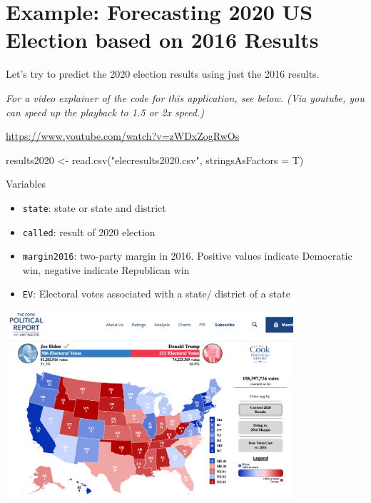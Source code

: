 \documentclass[
  letterpaper,
  DIV=11,
  numbers=noendperiod]{scrreprt}
\newenvironment{Shaded}{\begin{snugshade}}{\end{snugshade}}
\newcommand{\AttributeTok}[1]{\textcolor[rgb]{0.40,0.45,0.13}{#1}}
\newcommand{\FunctionTok}[1]{\textcolor[rgb]{0.28,0.35,0.67}{#1}}
\newcommand{\NormalTok}[1]{\textcolor[rgb]{0.00,0.23,0.31}{#1}}
\newcommand{\OtherTok}[1]{\textcolor[rgb]{0.00,0.23,0.31}{#1}}
\newcommand{\StringTok}[1]{\textcolor[rgb]{0.13,0.47,0.30}{#1}}
\providecommand{\tightlist}{%
  \setlength{\itemsep}{0pt}\setlength{\parskip}{0pt}}\usepackage{longtable,booktabs,array}
\begin{document}
\hypertarget{example-forecasting-2020-us-election-based-on-2016-results}{%
\section{Example: Forecasting 2020 US Election based on 2016
Results}\label{example-forecasting-2020-us-election-based-on-2016-results}}

Let's try to predict the 2020 election results using just the 2016
results.

\emph{For a video explainer of the code for this application, see below.
(Via youtube, you can speed up the playback to 1.5 or 2x speed.)}

\url{https://www.youtube.com/watch?v=zWDxZogRwOs}

\begin{Shaded}
\begin{Highlighting}[]
\NormalTok{results2020 }\OtherTok{\textless{}{-}} \FunctionTok{read.csv}\NormalTok{(}\StringTok{"elecresults2020.csv"}\NormalTok{, }\AttributeTok{stringsAsFactors =}\NormalTok{ T)}
\end{Highlighting}
\end{Shaded}

Variables

\begin{itemize}
\tightlist
\item
  \texttt{state}: state or state and district
\item
  \texttt{called}: result of 2020 election
\item
  \texttt{margin2016}: two-party margin in 2016. Positive values
  indicate Democratic win, negative indicate Republican win
\item
  \texttt{EV}: Electoral votes associated with a state/ district of a
  state
\end{itemize}

\includegraphics[width=0.8\textwidth,height=\textheight]{images/result2020.png}
\end{document}
